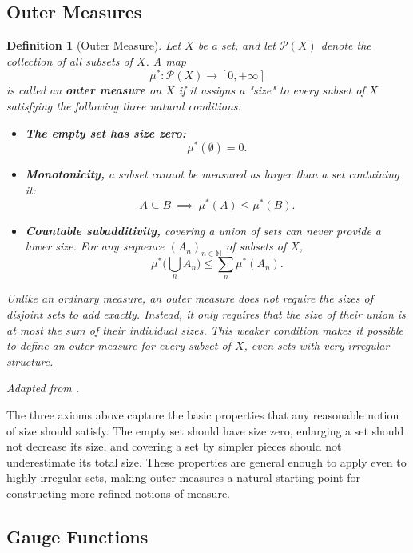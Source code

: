 \documentclass{article}
\newtheorem{definition}{Definition}
\begin{document}
\subsection{Outer Measures}

\begin{definition}[Outer Measure]\label{def:outer-measure}
Let $X$ be a set, and let $\mathcal{P}(X)$ denote the collection of all
subsets of $X$. A map
\[
    \mu^*:\mathcal{P}(X)\to[0,+\infty]
\]
is called an \textbf{outer measure} on $X$ if it assigns a "size" to every
subset of $X$ satisfying the following three natural conditions:

\begin{itemize}
    \item \textbf{The empty set has size zero:}
    \[
        \mu^*(\emptyset)=0.
    \]

    \item \textbf{Monotonicity,} a subset cannot be measured as
    larger than a set containing it:
    \[
        A\subseteq B \ \implies\ \mu^*(A)\le \mu^*(B).
    \]

    \item \textbf{Countable subadditivity,} covering a union of
    sets can never provide a lower size. For any sequence
    $(A_n)_{n\in\mathbb{N}}$ of subsets of $X$,
    \[
        \mu^*\Big(\bigcup_{n} A_n\Big) \le \sum_n \mu^*(A_n).
    \]
\end{itemize}

Unlike an ordinary measure, an outer measure does not require the sizes of
disjoint sets to add exactly. Instead, it only requires that the size of their
union is at most the sum of their individual sizes. This weaker condition makes
it possible to define an outer measure for every subset of $X$, even sets with
very irregular structure.

\emph{Adapted from \cite{ouyaaznechba2021hausdorff}.} 
\end{definition}

The three axioms above capture the basic properties that any reasonable notion of size should satisfy. The empty set should have size zero, enlarging a set should not decrease its size, and covering a set by simpler pieces should not underestimate its total size. These properties are general enough to apply even to highly irregular sets, making outer measures a natural starting point for constructing more refined notions of measure.

\subsection{Gauge Functions}
\end{document}
